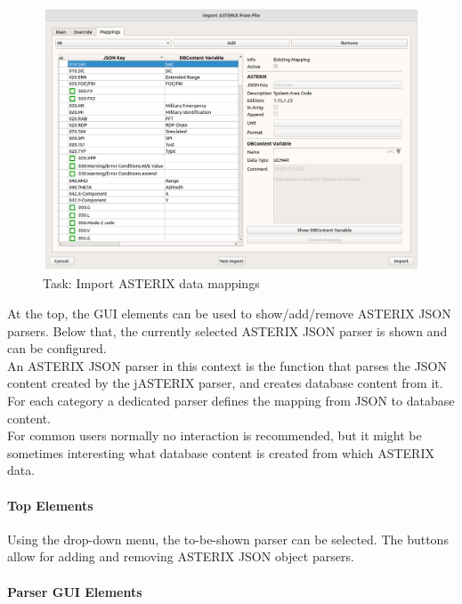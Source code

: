 \begin{figure}[H]
  \center
    \hspace*{-0.5cm}
    \includegraphics[width=17cm]{figures/asterix_import_data_mappings.png}
  \caption{Task: Import ASTERIX data mappings}
\end{figure}

At the top, the GUI elements can be used to show/add/remove ASTERIX JSON parsers. Below that, the currently selected ASTERIX JSON parser is shown and can be configured. \\

An ASTERIX JSON parser in this context is the function that parses the JSON content created by the jASTERIX parser, and creates database content from it. For each category a dedicated parser defines the mapping from JSON to database content. \\

For common users normally no interaction is recommended, but it might be sometimes interesting what database content is created from which ASTERIX data.

\paragraph{Top Elements}

Using the drop-down menu, the to-be-shown parser can be selected. The buttons allow for adding and removing ASTERIX JSON object parsers.

\paragraph{Parser GUI Elements}

